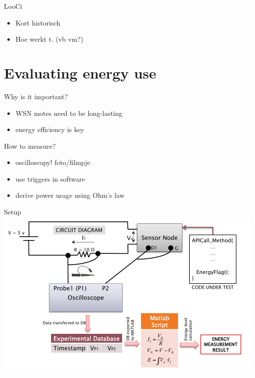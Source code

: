 \documentclass[presentation, bigger]{beamer}
\begin{document}
\begin{frame}[label=sec-2-3]{LooCi}
\begin{itemize}
\item Kort historisch
\item Hoe werkt t. (vb vm?)
\end{itemize}
\end{frame}
\section{Evaluating energy use}
\label{sec-3}

\begin{frame}[label=sec-3-1]{Why is it important?}
\begin{itemize}
\item WSN motes need to be long-lasting
\item energy efficiency is key
\end{itemize}
\end{frame}

\begin{frame}[label=sec-3-2]{How to measure?}
\begin{itemize}
\item oscilloscopy!
foto/filmpje
\item use triggers in software
\item derive power usage using Ohm's law
\end{itemize}
\end{frame}

\begin{frame}[label=sec-3-3]{Setup}
\includegraphics[width=\textwidth,keepaspectration=true]{energy_measurement_diagram}
\end{frame}
\end{document}
